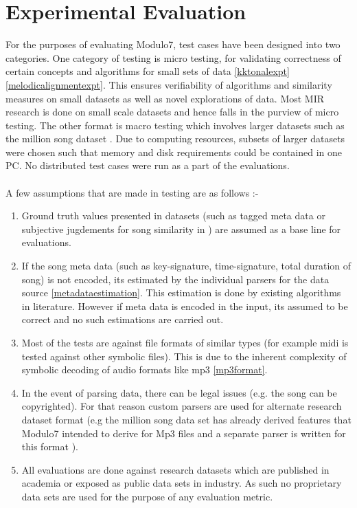 \chapter{Experimental Evaluation}

\noindent For the purposes of evaluating Modulo7, test cases have been designed into two categories. One category of testing is micro testing, for validating correctness of certain concepts and algorithms for small sets of data \ref{kktonalexpt} \ref{melodicalignmentexpt}. This ensures verifiability of algorithms and similarity measures on small datasets as well as novel explorations of data. Most MIR research is done on small scale datasets and hence falls in the purview of micro testing. The other format is macro testing which involves larger datasets such as the million song dataset \cite{msd}. Due to computing resources, subsets of larger datasets were chosen such that memory and disk requirements could be  contained in one PC. No distributed test cases were run as a part of the evaluations. \\\\
A few assumptions that are made in testing are as follows :-
\begin{enumerate}
\item Ground truth values presented in datasets (such as tagged meta data or subjective jugdements for song similarity in \cite{msd}) are assumed as a base line for evaluations.
\item If the song meta data (such as key-signature, time-signature, total duration of song) is not encoded, its estimated by the individual parsers for the data source \ref{metadataestimation}. This estimation is done by existing algorithms in literature. However if meta data is encoded in the input, its assumed to be correct and no such estimations are carried out. 
\item Most of the tests are against file formats of similar types (for example midi is tested against other symbolic files). This is due to the inherent complexity of symbolic decoding of audio formats like mp3 \ref{mp3format}.
\item In the event of parsing data, there can be legal issues (e.g. the song can be copyrighted). For that reason custom parsers are used for alternate research dataset format (e.g the million song data set has already derived features that Modulo7 intended to derive for Mp3 files and a separate parser is written for this format \cite{msd}). 
\item All evaluations are done against research datasets \cite{WikifoniaDataset, saarlandmsd, msd} which are published in academia or exposed as public data sets in industry. As such no proprietary data sets are used for the purpose of any evaluation metric.
\end{enumerate}

